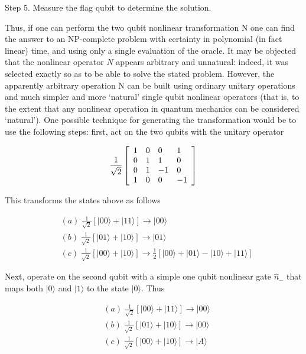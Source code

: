 \documentclass[12pt]{article}
\begin{document}
Step 5. Measure the flag qubit to determine the solution.

Thus, if one can perform the two qubit nonlinear transformation N one can find
the answer to an NP-complete problem with certainty in polynomial (in fact
linear) time, and using only a single evaluation of the oracle. It may be
objected that the nonlinear operator $N$ appears arbitrary and unnatural:
indeed, it was selected exactly so as to be able to solve the stated problem.
However, the apparently arbitrary operation N can be built using ordinary
unitary operations and much simpler and more `natural' single qubit nonlinear
operators (that is, to the extent that any nonlinear operation in quantum
mechanics can be considered `natural'). One possible technique for generating
the transformation would be to use the following steps: first, act on the two
qubits with the unitary operator

\begin{equation}
\frac{1}{\sqrt{2}}\left[
\begin{array}
[c]{llll}%
1 & 0 & 0 & 1\\
0 & 1 & 1 & 0\\
0 & 1 & -1 & 0\\
1 & 0 & 0 & -1
\end{array}
\right]
\end{equation}

This transforms the states above as follows%

\begin{align}
&  (a)\;\frac{1}{\sqrt{2}}\left[  |00\rangle+|11\rangle\right]
\longrightarrow|00\rangle\nonumber\\
&  (b)\;\frac{1}{\sqrt{2}}\left[  |01\rangle+|10\rangle\right]
\longrightarrow|01\rangle\\
&  (c)\;\frac{1}{\sqrt{2}}\left[  |00\rangle+|10\rangle\right]
\longrightarrow\frac{1}{2}\left[  |00\rangle+|01\rangle-|10\rangle
+|11\rangle\right] \nonumber
\end{align}

Next, operate on the second qubit with a simple one qubit nonlinear gate
$\widehat{n}_{-}$ that maps both
$\vert 0 \rangle$
and
$\vert 1 \rangle$
to the state
$\vert 0 \rangle$. Thus%

\begin{align}
&  (a)\;\frac{1}{\sqrt{2}}\left[  |00\rangle+|11\rangle\right]
\longrightarrow|00\rangle\nonumber\\
&  (b)\;\frac{1}{\sqrt{2}}\left[  |01\rangle+|10\rangle\right]
\longrightarrow|00\rangle\\
&  (c)\;\frac{1}{\sqrt{2}}\left[  |00\rangle+|10\rangle\right]
\longrightarrow|A\rangle\nonumber
\end{align}
\end{document}
